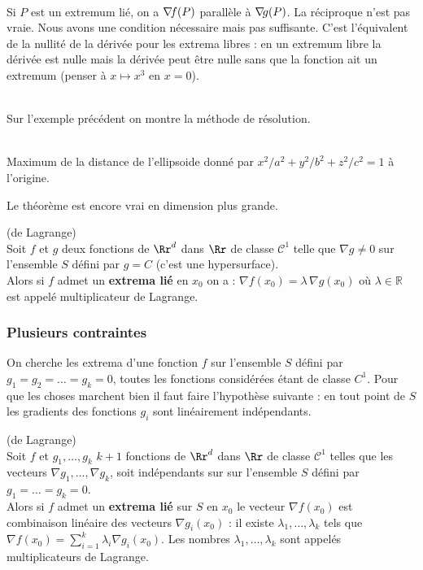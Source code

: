 \documentclass[class=report,crop=false]{standalone}
\begin{document}
{{{{{{{{{{{{{{{{\\
Si $P$ est un extremum lié, on a $\nabla\hspace{-0.6mm} f(P)$ parall\`ele \`a $\nabla\hspace{-0.6mm} g(P)$.
La réciproque n'est pas vraie. Nous avons une condition nécessaire mais pas suffisante. C'est l'équivalent de la nullité de la dérivée pour les extrema libres : en un extremum libre la dérivée est nulle mais la dérivée peut \^etre nulle sans que la fonction ait un extremum (penser \`a $x\mapsto x^3$ en $x=0$).  


\\
Sur l'exemple précédent on montre la méthode de résolution.

\\
Maximum de la distance de l'ellipsoide donné par $x^2/a^2+y^2/b^2+z^2/c^2=1$ \`a l'origine.

Le théor\`eme est encore vrai en dimension plus grande.
\begin{theoreme}(de Lagrange)\\
Soit $f$ et $g$ deux fonctions de $\Rr^d$ dans $\Rr$  de classe $\mathcal{C}^1$ telle que $\nabla g \neq 0$ sur l'ensemble $S$ défini par $g=C$ (c'est une hypersurface).\\
Alors si $f$ admet un {\bf extrema lié} en $x_0$ on a : $\nabla f(x_{0}) = \lambda\, \nabla g(x_{0})$ o\`u $\lambda \in \mathbb{R}$ est appelé multiplicateur de Lagrange.
\end{theoreme}


\subsubsection{Plusieurs contraintes}
On cherche les extrema d'une fonction $f$  sur l'ensemble $S$ défini par $g_1=g_2=\ldots=g_k=0$, toutes les fonctions considérées étant de classe $C^1$. Pour que les choses marchent bien il faut faire l'hypoth\`ese suivante : en tout point de $S$ les gradients des fonctions $g_i$ sont linéairement indépendants. 
\begin{theoreme}(de Lagrange)\\
Soit $f$ et $g_1,\ldots, g_k$ $k+1$ fonctions de $\Rr^d$ dans $\Rr$  de classe $\mathcal{C}^1$ telles que les vecteurs $\nabla g_1,\ldots, \nabla g_k$,  soit indépendants sur  sur l'ensemble $S$ défini par $g_1=\ldots=g_k=0$.\\
Alors si $f$ admet un {\bf extrema lié} sur $S$ en $x_0$ le vecteur $\nabla f(x_{0})$ est combinaison linéaire des vecteurs $\nabla g_i(x_{0})$ : il existe $\lambda_1,\ldots,\lambda_k$ tels que $\nabla f(x_{0})=\sum_{i=1}^k\lambda_i\nabla g_i(x_{0})$. Les nombres $\lambda_1,\ldots,\lambda_k$ sont appelés multiplicateurs de Lagrange.
\end{theoreme}
\newpage
}}}}}}}}}}}}}}}}
\end{document}
